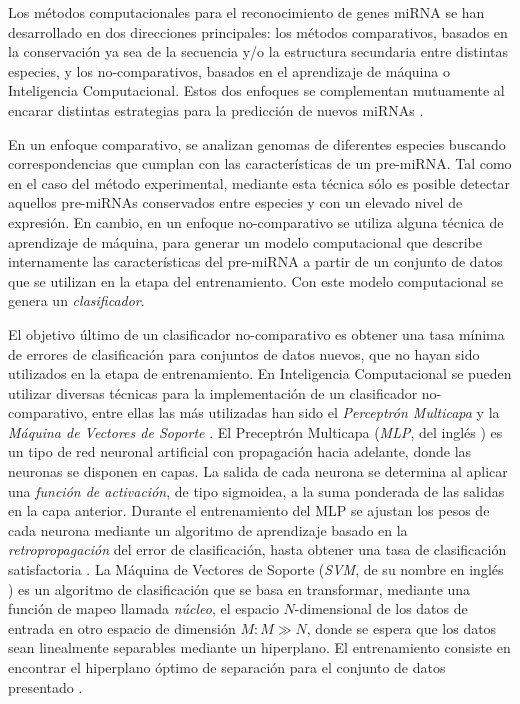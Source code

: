 \documentclass[12pt,bibliography=oldstyle,DIV=14,parskip=full-,titlepage]{scrartcl}
\begin{document}
Los métodos computacionales para el reconocimiento de genes miRNA se
han desarrollado en dos direcciones principales: los métodos
comparativos, basados en la conservación ya sea de la secuencia y/o la
estructura secundaria entre distintas especies, y los no-comparativos,
basados en el aprendizaje de máquina o Inteligencia
Computacional. Estos dos enfoques se complementan mutuamente al
encarar distintas estrategias para la predicción de nuevos miRNAs
\cite{batuwita}\cite{sheng}.

En un enfoque comparativo, se analizan genomas de diferentes especies
buscando correspondencias que cumplan con las características de un
pre-miRNA. Tal como en el caso del método experimental, mediante esta
técnica sólo es posible detectar aquellos pre-miRNAs conservados entre
especies y con un elevado nivel de expresión. En cambio, en un enfoque
no-comparativo se utiliza alguna técnica de aprendizaje de máquina,
para generar un modelo computacional que describe internamente las
características del pre-miRNA a partir de un conjunto de datos que se
utilizan en la etapa del entrenamiento. Con este modelo computacional
se genera un \emph{clasificador}.

El objetivo último de un clasificador no-comparativo es obtener una
tasa mínima de errores de clasificación para conjuntos de datos
nuevos, que no hayan sido utilizados en la etapa de entrenamiento.  En
Inteligencia Computacional se pueden utilizar diversas técnicas para
la implementación de un clasificador no-comparativo, entre ellas las
más utilizadas han sido el \emph{Perceptrón Multicapa}
\cite{mlp1}\cite{mlp2} y la \emph{Máquina de Vectores de Soporte}
\cite{svm}.  El Preceptrón Multicapa (\emph{MLP}, del inglés
) es un tipo de red neuronal artificial con
propagación hacia adelante, donde las neuronas se disponen en capas.
La salida de cada neurona se determina al aplicar una \emph{función de
  activación}, de tipo sigmoidea, a la suma ponderada de las salidas
en la capa anterior. Durante el entrenamiento del MLP se ajustan los
pesos de cada neurona mediante un algoritmo de aprendizaje basado en
la \emph{retropropagación} del error de clasificación, hasta obtener
una tasa de clasificación satisfactoria \cite{jain}.  La Máquina de
Vectores de Soporte (\emph{SVM}, de su nombre en inglés ) es un algoritmo de clasificación que se basa en
transformar, mediante una función de mapeo llamada \emph{núcleo}, el
espacio $N$-dimensional de los datos de entrada en otro espacio de
dimensión $M: M\gg N$, donde se espera que los datos sean linealmente
separables mediante un hiperplano. El entrenamiento consiste en
encontrar el hiperplano óptimo de separación para el conjunto de datos
presentado \cite{bottou}.
\end{document}
